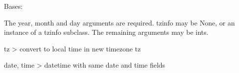 \documentclass[letterpaper,10pt,english]{sphinxmanual}
\begin{document}
\begin{fulllineitems}
\label{\detokenize{modules/src.pig_sorting_api.main:src.pig_sorting_api.main.datetime}}
\pysigstartsignatures
\pysiglinewithargsret
{}
{\sphinxparamcomma {}\sphinxparamcomma {}}
{}
\pysigstopsignatures
\sphinxAtStartPar
Bases: {\hyperref[\detokenize{modules/src.pig_sorting_api.main:src.pig_sorting_api.main.datetime.date}]{}}

\sphinxAtStartPar
The year, month and day arguments are required. tzinfo may be None, or an
instance of a tzinfo subclass. The remaining arguments may be ints.

\begin{fulllineitems}
\label{\detokenize{modules/src.pig_sorting_api.main:src.pig_sorting_api.main.datetime.astimezone}}
\pysigstartsignatures
\pysiglinewithargsret
{}
{}
{}
\pysigstopsignatures
\sphinxAtStartPar
tz \sphinxhyphen{}\textgreater{} convert to local time in new timezone tz

\end{fulllineitems}


\begin{fulllineitems}
\label{\detokenize{modules/src.pig_sorting_api.main:src.pig_sorting_api.main.datetime.combine}}
\pysigstartsignatures
\pysiglinewithargsret
{}
{}
{}
\pysigstopsignatures
\sphinxAtStartPar
date, time \sphinxhyphen{}\textgreater{} datetime with same date and time fields


\end{fulllineitems}
\end{fulllineitems}
\end{document}
